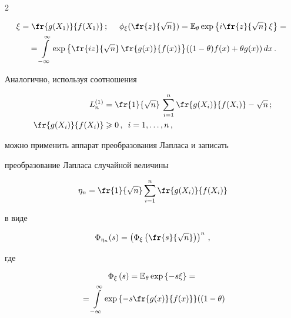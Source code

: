 \begin{multicols}{2}
\vspace*{-6pt}



\noindent

\begin{multline*}

\xi=\fr{g(X_1)}{f(X_1)}\,;\ \ \ \ \phi_\xi(\fr {z}{\sqrt

n})=\E_\theta \exp{\left\{i\fr{z}{\sqrt

n}\,\xi\right\}}={}\\

{}=\int\limits_{-\infty}^\infty\exp{\left\{\fr {iz}{\sqrt

n}\,\fr{g(x)}{f(x)}\right\}}((1-\theta) f(x)+\theta

 g(x))\,dx\,.

\end{multline*}

Аналогично, используя соотношения

\begin{align*}

L_n^{(1)}&=\fr{1}{\sqrt{n}}\,\sum_{i=1}^n\fr{g(X_i)}{f(X_i)}-\sqrt{n}\,;

\\

\fr{g(X_i)}{f(X_i)}&\geqslant 0\,,\enskip  i=1,\ldots,n\,,

\end{align*}

можно применить аппарат преобразования Лапласа и записать

преобразование Лапласа случайной величины

$$

\eta_n=\fr{1}{\sqrt{n}}\sum_{i=1}^n\fr{g(X_i)}{f(X_i)}

$$

в виде

$$

\Phi_{\eta_n}(s)=\left(\Phi_\xi\left(\fr {s}{\sqrt

n}\right)\right)^n\,,

$$

где



\noindent

\begin{multline*}

\Phi_\xi\left(s\right)=\E_\theta

\exp{\left\{-s\xi\right\}}={}\\

{}=\int\limits_{-\infty}^\infty\exp{\left\{-s\fr{g(x)}{f(x)}\right\}}((1-\theta)


\end{multline*}
\end{multicols}
